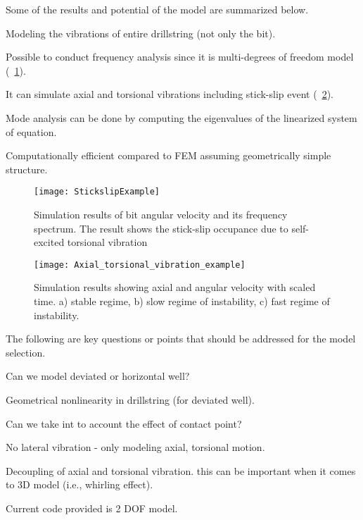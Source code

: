 Some of the results and potential of the model are summarized below.
\begin{bulletedlist}
  \item Modeling the vibrations of entire drillstring (not only the bit).
  \item Possible to conduct frequency analysis since it is multi-degrees of freedom model (\figurename~\ref{StickslipExample}).
  \item It can simulate axial and torsional vibrations including stick-slip event (\figurename~\ref{Axial_torsional_vibration_example}).
  \item Mode analysis can be done by computing the eigenvalues of the linearized system of equation.
  \item Computationally efficient compared to FEM assuming geometrically simple structure.
\end{bulletedlist}

\begin{figure}[ht]
  \centering
  \texttt{[image: StickslipExample]}
  \caption[Simulation results of bit angular velocity and its frequency spectrum]{Simulation results of bit angular velocity and its frequency spectrum. The result shows the stick-slip occupance due to self-excited torsional vibration}\label{StickslipExample}
\end{figure}

\newpage

\begin{figure}[ht]
  \centering
  \texttt{[image: Axial\_torsional\_vibration\_example]}
  \caption[Simulation results showing axial and angular velocity with scaled time]{Simulation results showing axial and angular velocity with scaled time. a) stable regime, b) slow regime of instability, c) fast regime of instability.}\label{Axial_torsional_vibration_example}
\end{figure}

\noindent The following are key questions or points that should be addressed for the model selection.
\begin{bulletedlist}
  \item Can we model deviated or horizontal well?
  \item Geometrical nonlinearity in drillstring (for deviated well).
  \item Can we take int to account the effect of contact point?
  \item No lateral vibration - only modeling axial, torsional motion.
  \item Decoupling of axial and torsional vibration. this can be important when it comes to 3D model (i.e., whirling effect).
  \item Current code provided is 2 DOF model.
\end{bulletedlist} 

